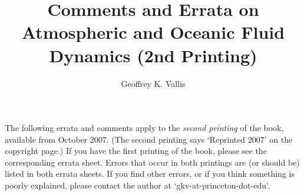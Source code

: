 \documentclass[10pt]{article}
\begin{document}
\title{\sffamily Comments and Errata on Atmospheric and Oceanic Fluid Dynamics (2nd Printing)}
\author{\sffamily Geoffrey K. Vallis}
\maketitle
%

\noindent 


The following errata and comments apply to the \emph{second printing} of the book, available from October 2007. (The second printing says `Reprinted 2007' on the copyright page.) If you have the first printing of the book, please see the corresponding errata sheet. Errors that occur in both printings are (or should be) listed in both errata sheets. If you find other errors, or if you think something is poorly explained, please contact the author at `gkv-at-princeton-dot-edu'. 
\end{document}
